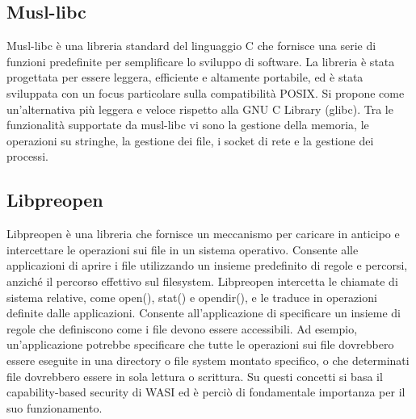 \subsection{Musl-libc}
Musl-libc è una libreria standard del linguaggio C che fornisce una serie di funzioni predefinite per semplificare lo
sviluppo di software. La libreria è stata progettata per essere leggera, efficiente e altamente portabile, ed è stata
sviluppata con un focus particolare sulla compatibilità POSIX. Si propone come un'alternativa più leggera e veloce
rispetto alla GNU C Library (glibc). Tra le funzionalità supportate da musl-libc vi sono la gestione della memoria, le
operazioni su stringhe, la gestione dei file, i socket di rete e la gestione dei processi.
\subsection{Libpreopen}
\label{sec:libpreopen}
Libpreopen è una libreria che fornisce un meccanismo per caricare in anticipo e intercettare le operazioni sui file in
un sistema operativo. Consente alle applicazioni di aprire i file utilizzando un insieme predefinito di regole e
percorsi, anziché il percorso effettivo sul filesystem. Libpreopen intercetta le chiamate di sistema relative, come
open(), stat() e opendir(), e le traduce in operazioni definite dalle applicazioni. Consente all'applicazione di
specificare un insieme di regole che definiscono come i file devono essere accessibili. Ad esempio, un'applicazione
potrebbe specificare che tutte le operazioni sui file dovrebbero essere eseguite in una directory o file system montato
specifico, o che determinati file dovrebbero essere in sola lettura o scrittura. Su questi concetti si basa il
capability-based security di WASI ed è perciò di fondamentale importanza per il suo funzionamento.


